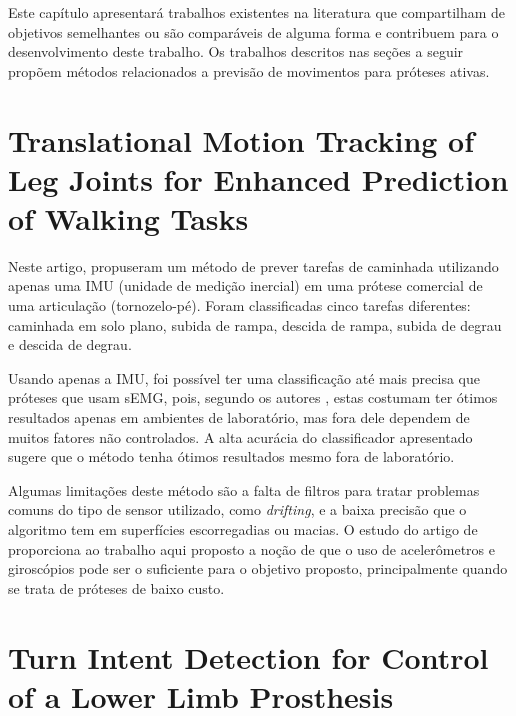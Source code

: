 Este capítulo apresentará trabalhos existentes na literatura que compartilham de objetivos semelhantes ou são comparáveis de alguma forma e contribuem para o desenvolvimento deste trabalho. Os trabalhos descritos nas seções a seguir propõem métodos relacionados a previsão de movimentos para próteses ativas.

\section{Translational Motion Tracking of Leg Joints for Enhanced Prediction of Walking Tasks}\label{sec:rel_stolyarov}

Neste artigo,  propuseram um método de prever tarefas de caminhada utilizando apenas uma IMU (unidade de medição inercial) em uma prótese comercial de uma articulação (tornozelo-pé). Foram classificadas cinco tarefas diferentes: caminhada em solo plano, subida de rampa, descida de rampa, subida de degrau e descida de degrau.

Usando apenas a IMU, foi possível ter uma classificação até mais precisa que próteses que usam sEMG, pois, segundo os autores , estas costumam ter ótimos resultados apenas em ambientes de laboratório, mas fora dele dependem de muitos fatores não controlados. A alta acurácia do classificador apresentado sugere que o método tenha ótimos resultados mesmo fora de laboratório.

Algumas limitações deste método são a falta de filtros para tratar problemas comuns do tipo de sensor utilizado, como \textit{drifting}, e a baixa precisão que o algoritmo tem em superfícies escorregadias ou macias.
% 
O estudo do artigo de  proporciona ao trabalho aqui proposto a noção de que o uso de acelerômetros e giroscópios pode ser o suficiente para o objetivo proposto, principalmente quando se trata de próteses de baixo custo.

\section{Turn Intent Detection for Control of a Lower Limb Prosthesis}\label{sec:rel_pew}

